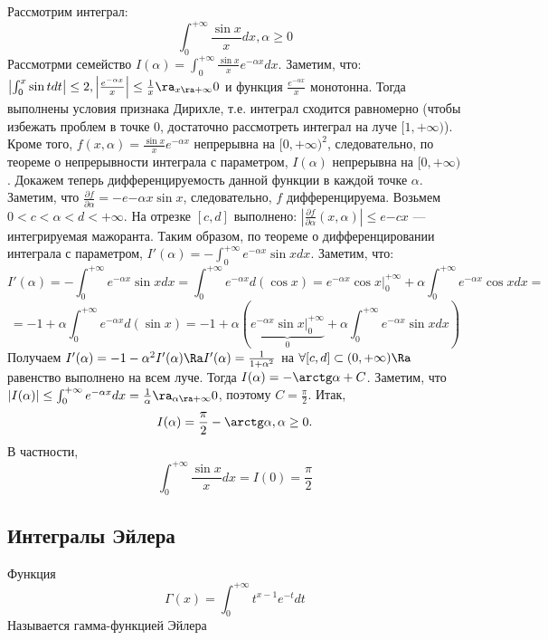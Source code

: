 \begin{example}
    Рассмотрим интеграл:
    \[\int_0^{+\infty}\frac{\sin x}{x}dx, \alpha \ge 0\]
    Рассмотрми семейство \(I(\alpha) = \int_0^{+\infty} \frac{\sin x}{x}e^{-\alpha x}dx\). Заметим, что: \(\left| \int_0^x \sin t dt \right| \le 2, \left| \frac{e^{-\alpha x}}{x} \right| \le \frac{1}{x} \ra_{x \ra +\infty} 0\) и функция \(\frac{e^{-\alpha x}}{x}\) монотонна. Тогда выполнены условия признака Дирихле, т.е. интеграл сходится равномерно (чтобы избежать проблем в точке 0, достаточно рассмотреть интеграл на луче \([1, +\infty)\)). Кроме того, \(f(x, \alpha) = \frac{\sin x}{x}e^{-\alpha x}\) непрерывна на \([0, +\infty)^2\), следовательно, по теореме о непрерывности интеграла с параметром, \(I(\alpha)\) непрерывна на \([0, +\infty)\). Докажем теперь дифференцируемость данной функции в каждой точке \(\alpha\). Заметим, что \(\frac{\partial f}{\partial \alpha} = -e{-\alpha x} \sin x\), следовательно, \(f\) дифференцируема. Возьмем \(0 < c < \alpha < d < +\infty\). На отрезке \([c, d]\) выполнено: \(\left|\frac{\partial f}{\partial \alpha}(x, \alpha)\right| \le e{-cx} \) --- интегрируемая мажоранта. Таким образом, по теореме о дифференцировании интеграла с параметром, \(I'(\alpha) = -\int_0^{+\infty}e^{-\alpha x}\sin x dx\). Заметим, что:
    \[I'(\alpha) = -\int_0^{+\infty}e^{-\alpha x}\sin xdx = \int_0^{+\infty}e^{-\alpha x}d(\cos x) = e^{-\alpha x}\cos x\big|_{0}^{+\infty} + \alpha \int_0^{+\infty}e^{-\alpha x} \cos xdx =\]
    \[= -1 + \alpha \int_0^{+\infty}e^{-\alpha x}d(\sin x) = -1 + \alpha \left( \underbrace{e^{-\alpha x}\sin x\big|_0^{+\infty}}_{0} + \alpha \int_0^{+\infty}e^{-\alpha x}\sin x dx \right)\]
    Получаем \(I'(\alpha) = -1 - \alpha^2I'(\alpha) \Ra I'(\alpha) = \frac{1}{1 + \alpha^2}\) на \(\forall [c, d] \subset (0, +\infty)\Ra \) равенство выполнено на всем луче. Тогда \(I(\alpha) = -\arctg \alpha + C\). Заметим, что \(|I(\alpha)| \le \int_0^{+\infty} e^{-\alpha x}dx = \frac{1}{\alpha} \ra_{\alpha \ra +\infty} 0\), поэтому \(C = \frac{\pi}{2}\). Итак,
    \[I(\alpha) = \frac{\pi}{2} - \arctg \alpha, \alpha \ge 0.\]
    В частности,
    \[\int_0^{+\infty} \frac{\sin x}{x} dx = I(0) = \frac{\pi}{2}\]
\end{example}

\subsection{Интегралы Эйлера}

\begin{definition}
    Функция
    \[\Gamma(x) = \int_0^{+\infty} t^{x - 1}e^{-t}dt\]
    Называется гамма-функцией Эйлера
\end{definition}

